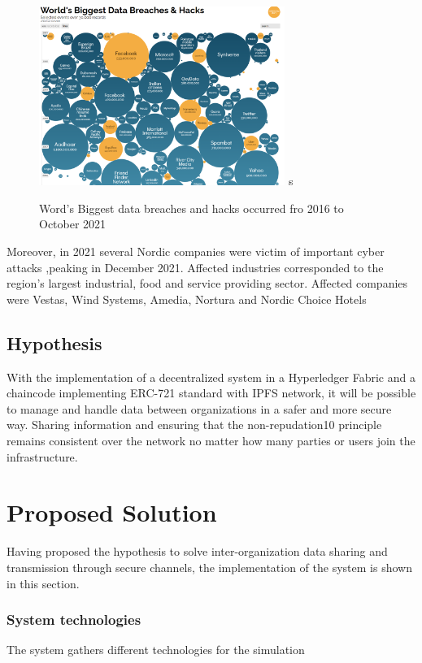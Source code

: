 \documentclass[a4paper]{article}
\begin{document}
\begin{figure}[ht]
\begin{center}
\includegraphics[width=8cm]{img/DataBreach.png}
s\caption{Word's Biggest data breaches and hacks occurred fro 2016 to October 2021  \cite{WorldDataBreach:online}}
\end{center}
\label{fig:worldDataBreach}
\end{figure}
Moreover, in 2021 several Nordic companies were victim of important cyber attacks ,peaking in December 2021\cite{Nordicco81:online}. Affected industries corresponded to the region’s largest industrial, food and  service providing sector.
Affected companies were Vestas, Wind Systems, Amedia, Nortura and Nordic Choice Hotels

\subsection{Hypothesis}
With the implementation of a decentralized system in a Hyperledger Fabric and
a chaincode implementing ERC-721 standard with IPFS network, it will be possible to manage and handle data between organizations in a safer and more secure
way. Sharing information and ensuring that the non-repudation10 principle remains consistent over the network no matter how many parties or users join the
infrastructure.


\section{Proposed Solution}
Having proposed the hypothesis to solve inter-organization data sharing and transmission through secure channels, the implementation of the system is shown in this section.

\subsubsection{System technologies}
The system gathers different technologies for the simulation 
\end{document}
